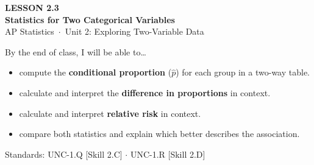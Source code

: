 \documentclass[aspectratio=169, 11pt]{beamer}
\begin{document}
{
\begin{frame}[plain]
  \vspace{2.8cm}\hspace{0.55cm}%
  \begin{minipage}{0.9\textwidth}
    {\color{goldacc}\bfseries\small LESSON 2.3}\\[0.5cm]
    {\color{white}\bfseries\LARGE Statistics for Two Categorical Variables}\\[1.2cm]
    {\color{skymid}\small AP Statistics~$\cdot$~Unit 2: Exploring Two-Variable Data}
  \end{minipage}
\end{frame}
}

\begin{frame}[t, plain]
  \vspace{0.3cm}
  By the end of class, I will be able to\dots
  \begin{itemize}
    \item compute the \textbf{conditional proportion} ($\hat{p}$) for each group in a two-way table.
    \item calculate and interpret the \textbf{difference in proportions} in context.
    \item calculate and interpret \textbf{relative risk} in context.
    \item compare both statistics and explain which better describes the association.
  \end{itemize}
  \vspace{0.5cm}
  \textcolor{goldacc}{\small Standards: UNC-1.Q [Skill 2.C] $\cdot$ UNC-1.R [Skill 2.D]}
\end{frame}
\end{document}
